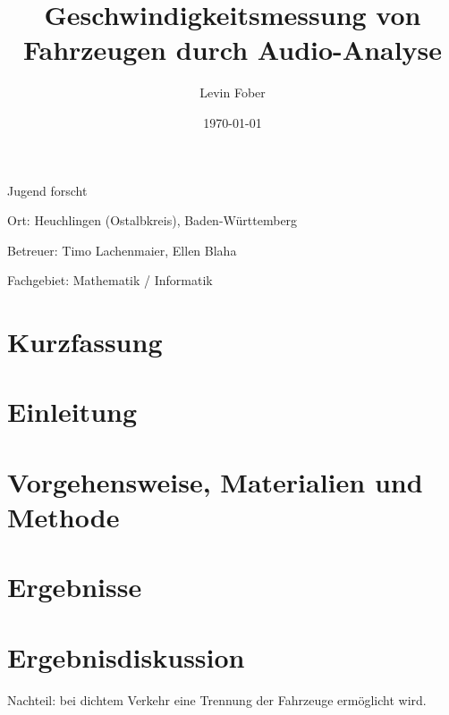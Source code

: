 \documentclass[12pt, a4paper]{article}
\title{\textbf{Geschwindigkeitsmessung von Fahrzeugen durch Audio-Analyse}}
\author{Levin Fober}
\date{\today}
\begin{document}

\maketitle

\begin{center}
    Jugend forscht

    Ort: Heuchlingen (Ostalbkreis), Baden-Württemberg

    Betreuer: Timo Lachenmaier, Ellen Blaha

    Fachgebiet: Mathematik / Informatik
\end{center}

\newpage

\thispagestyle{plain}

\section*{Kurzfassung}

\newpage

\thispagestyle{plain}

\tableofcontents

\newpage

\listoftodos

\thispagestyle{plain}

\cleardoublepage%

\section{Einleitung}


\section{Vorgehensweise, Materialien und Methode}


\section{Ergebnisse}

\section{Ergebnisdiskussion}

Nachteil: bei dichtem Verkehr eine Trennung der Fahrzeuge ermöglicht wird.
\end{document}
